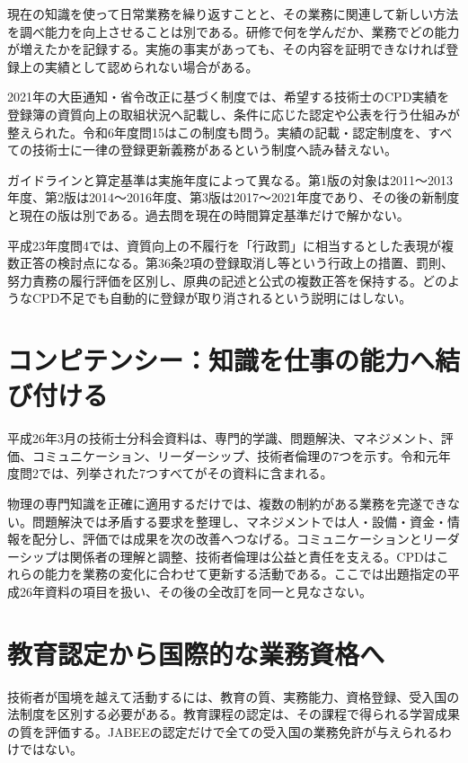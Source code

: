 現在の知識を使って日常業務を繰り返すことと、その業務に関連して新しい方法を調べ能力を向上させることは別である。研修で何を学んだか、業務でどの能力が増えたかを記録する。実施の事実があっても、その内容を証明できなければ登録上の実績として認められない場合がある。

2021年の大臣通知・省令改正に基づく制度では、希望する技術士のCPD実績を登録簿の資質向上の取組状況へ記載し、条件に応じた認定や公表を行う仕組みが整えられた\cite{cpd_new2021}。令和6年度問15はこの制度も問う。実績の記載・認定制度を、すべての技術士に一律の登録更新義務があるという制度へ読み替えない。

ガイドラインと算定基準は実施年度によって異なる。第1版の対象は2011〜2013年度、第2版は2014〜2016年度、第3版は2017〜2021年度であり、その後の新制度と現在の版は別である\cite{cpd_versions}。過去問を現在の時間算定基準だけで解かない。

平成23年度問4では、資質向上の不履行を「行政罰」に相当するとした表現が複数正答の検討点になる。第36条2項の登録取消し等という行政上の措置、罰則、努力責務の履行評価を区別し、原典の記述と公式の複数正答を保持する。どのようなCPD不足でも自動的に登録が取り消されるという説明にはしない。

\section{コンピテンシー：知識を仕事の能力へ結び付ける}
\label{theory:engineer_act:competency}
平成26年3月の技術士分科会資料は、専門的学識、問題解決、マネジメント、評価、コミュニケーション、リーダーシップ、技術者倫理の7つを示す\cite{mext_competency2014}。令和元年度問2では、列挙された7つすべてがその資料に含まれる。

物理の専門知識を正確に適用するだけでは、複数の制約がある業務を完遂できない。問題解決では矛盾する要求を整理し、マネジメントでは人・設備・資金・情報を配分し、評価では成果を次の改善へつなげる。コミュニケーションとリーダーシップは関係者の理解と調整、技術者倫理は公益と責任を支える。CPDはこれらの能力を業務の変化に合わせて更新する活動である。ここでは出題指定の平成26年資料の項目を扱い、その後の全改訂を同一と見なさない。

\section{教育認定から国際的な業務資格へ}
\label{theory:engineer_act:international}
技術者が国境を越えて活動するには、教育の質、実務能力、資格登録、受入国の法制度を区別する必要がある。教育課程の認定は、その課程で得られる学習成果の質を評価する。JABEEの認定だけで全ての受入国の業務免許が与えられるわけではない。

